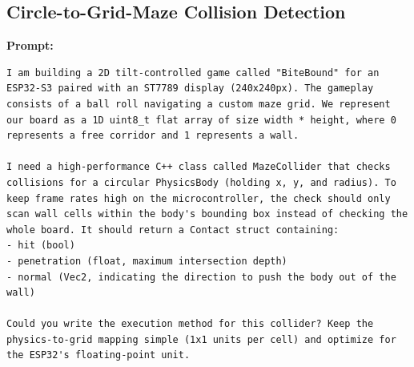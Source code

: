 \subsection*{Circle-to-Grid-Maze Collision Detection}

\textbf{Prompt:}
\begin{lstlisting}[language={}, breaklines=true]
I am building a 2D tilt-controlled game called "BiteBound" for an ESP32-S3 paired with an ST7789 display (240x240px). The gameplay consists of a ball roll navigating a custom maze grid. We represent our board as a 1D uint8_t flat array of size width * height, where 0 represents a free corridor and 1 represents a wall.

I need a high-performance C++ class called MazeCollider that checks collisions for a circular PhysicsBody (holding x, y, and radius). To keep frame rates high on the microcontroller, the check should only scan wall cells within the body's bounding box instead of checking the whole board. It should return a Contact struct containing:
- hit (bool)
- penetration (float, maximum intersection depth)
- normal (Vec2, indicating the direction to push the body out of the wall)

Could you write the execution method for this collider? Keep the physics-to-grid mapping simple (1x1 units per cell) and optimize for the ESP32's floating-point unit.
\end{lstlisting}


